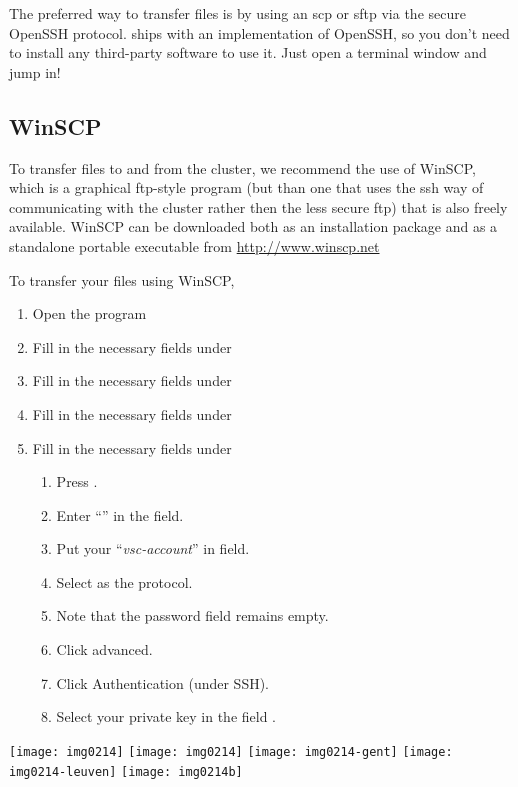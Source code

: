 \ifmacORlinux
The preferred way to transfer files is by using an scp or sftp via the secure
OpenSSH protocol.  \OS  ships with an implementation of
OpenSSH, so you don't need to install any third-party software to use it. Just
open a terminal window and jump in!
\fi

\ifwindows
  \subsection{WinSCP}

  To transfer files to and from the cluster, we recommend the use of WinSCP,
  which is a graphical ftp-style program (but than one that uses the ssh way of
  communicating with the cluster rather then the less secure ftp) that is also
  freely available. WinSCP can be downloaded both as an installation package
  and as a standalone portable executable from \url{http://www.winscp.net}

  To transfer your files using WinSCP,

  \begin{enumerate}
  \item  Open the program
\ifantwerpen
  \item  Fill in the necessary fields under 
\fi
\ifgent
  \item  Fill in the necessary fields under 
\fi
\ifbrussel
  \item  Fill in the necessary fields under 
\fi
\ifleuven
  \item  Fill in the necessary fields under 
\fi
  \begin{enumerate}
  \item  Press .
  \item  Enter ``\emph{\loginnode}'' in the  field.
  \item  Put your ``\emph{vsc-account}'' in  field.
  \item  Select  as the  protocol.
  \item  Note that the password field remains empty.
  \item  Click advanced.
  \item  Click Authentication (under SSH).
  \item  Select your private key in the field .
  \end{enumerate}
  \end{enumerate}

  \begin{center}
\ifantwerpen
  \texttt{[image: img0214]}
\fi
\ifbrussel
  \texttt{[image: img0214]}
\fi
\ifgent
  \texttt{[image: img0214-gent]}
\fi
\ifleuven
  \texttt{[image: img0214-leuven]}
\fi
  \texttt{[image: img0214b]}
  \end{center}

